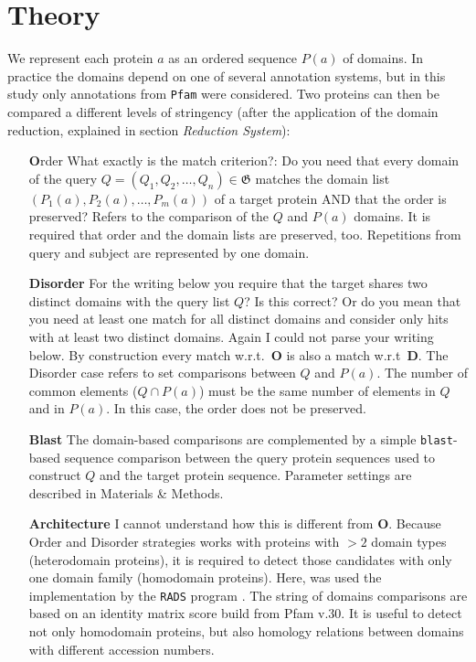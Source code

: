 \documentclass[11pt]{article}
\newcommand{\TODO}[1]{\begingroup\color{red}#1\endgroup}
\newcommand{\CAVH}[1]{\begingroup\color{green}#1\endgroup}
\begin{document}
\section*{Theory}

We represent each protein $a$ as an ordered sequence $P(a)$ of domains. In
practice the domains depend on one of several annotation systems, 
\CAVH{but in this study only annotations from \texttt{Pfam} were considered}. Two 
proteins can then be compared a different levels of stringency (\CAVH{after the 
application of the domain reduction, explained in section \textit{Reduction 
System}}):
\begin{itemize}
\item[\textbf{O}rder] \TODO{What exactly is the match criterion?: Do you need
    that every domain of the query
    $Q=(Q_1,Q_2,\dots,Q_n)\in \boldsymbol{\mathfrak{G}}$ matches the
    domain list $ (P_1(a),P_2(a),\dots,P_m(a))$ of a target protein AND that
    the order is preserved? }
    \CAVH{Refers to the comparison of the $Q$ and $P(a)$ domains. It is 
required that order and the domain lists are preserved, too. Repetitions from 
query and subject are represented by one domain.}
\item[\textbf{Disorder}] \TODO{For the writing below you require that the target
    shares two distinct domains with the query list $Q$? Is this correct?
    Or do you mean that you need at least one match for all distinct
    domains and consider only hits with at least two distinct
    domains. Again I could not parse your writing below.} By construction
  every match w.r.t.\ \textbf{O} is also a match w.r.t\ \textbf{D}.
  \CAVH{The Disorder case refers to set comparisons between $Q$ and $P(a)$. 
The number of common elements ($Q \cap P(a)$) must be the same number of 
elements in $Q$ and in $P(a)$. In this case, the order does not be 
preserved.} 
\item[\textbf{Blast}] The domain-based comparisons are complemented by a simple
  \texttt{blast}-based sequence comparison between the query protein
  sequences used to construct $Q$ and the target protein
  sequence. Parameter settings are described in Materials \& Methods.
\item[\textbf{Architecture}] \TODO{I cannot understand how this is different 
from \textbf{O}.} \CAVH{Because Order and Disorder strategies works with 
proteins with $> 2$ domain types (heterodomain proteins), it is required to 
detect those candidates with only one domain family (homodomain proteins). 
Here, was used the implementation by the \texttt{RADS} program  
\cite{Terrapon:2014}. The string of domains comparisons are based on 
an identity matrix score build from Pfam v.30. It is useful to detect not only 
homodomain proteins, but also homology relations between domains with different 
accession numbers.}  
\end{itemize}
\end{document}

